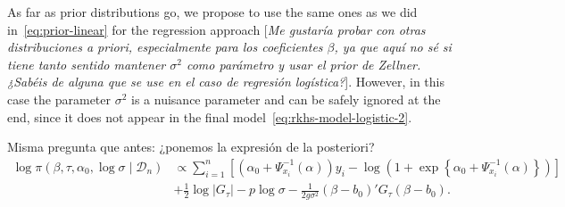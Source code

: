 \documentclass[ba]{imsart}
\numberwithin{equation}{section}
\theoremstyle{plain}
\newenvironment{comment}
{
\noindent \em \color{red}
}
{
\color{black}
}
\newcommand\incomment[1]{\color{red}[\textit{#1}]\color{black}}
\begin{document}
As far as prior distributions go, we propose to use the same ones as we did in~\eqref{eq:prior-linear} for the regression approach \incomment{Me gustaría probar con otras distribuciones a priori, especialmente para los coeficientes \(\beta\), ya que aquí no sé si tiene tanto sentido mantener \(\sigma^2\) como parámetro y usar el prior de Zellner. ¿Sabéis de alguna que se use en el caso de regresión logística?}. However, in this case the parameter \(\sigma^2\) is a nuisance parameter and can be safely ignored at the end, since it does not appear in the final model~\eqref{eq:rkhs-model-logistic-2}.

\begin{comment}
  Misma pregunta que antes: ¿ponemos la expresión de la posteriori?
  \begin{align*}
\log \pi(\beta, \tau, \alpha_0, \log\sigma\mid \mathcal D_n) & \propto \sum_{i=1}^n \left[ \left(\alpha_0 + \Psi^{-1}_{x_i}(\alpha)\right)y_i - \log\left(1 + \exp\left\{\alpha_0 + \Psi_{x_i}^{-1}(\alpha)\right\}\right)\right]\\
\quad &+ \frac{1}{2}\log |G_\tau| - p\log \sigma -\frac{1}{2g\sigma^2} (\beta - b_0)'G_\tau(\beta - b_0).
\end{align*}

\end{comment}
\end{document}
